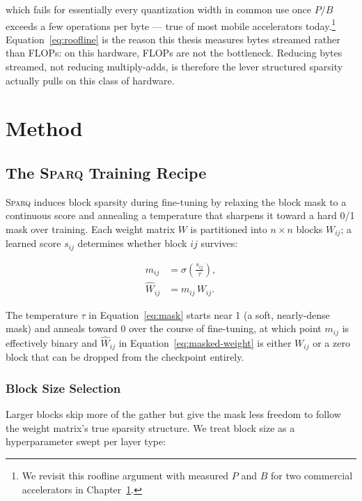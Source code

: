 \documentclass[11pt,twoside]{book}
\newcommand{\model}{\textsc{Sparq}\xspace}
\begin{document}
which fails for essentially every quantization width in common use once
\(P/B\) exceeds a few operations per byte --- true of most mobile
accelerators today.\footnote{We revisit this roofline argument with
measured $P$ and $B$ for two commercial accelerators in
Chapter~\ref{ch:method}.} Equation~\eqref{eq:roofline} is the reason this
thesis measures bytes streamed rather than FLOPs: on this hardware, FLOPs
are not the bottleneck. Reducing bytes streamed, not reducing
multiply-adds, is therefore the lever structured sparsity actually pulls
on this class of hardware.

\chapter{Method}
\label{ch:method}

\section{The \model{} Training Recipe}
\label{sec:sparq}

\model{} induces block sparsity during fine-tuning by relaxing the
block mask to a continuous score and annealing a temperature that
sharpens it toward a hard 0/1 mask over training. Each weight matrix
\(W\) is partitioned into \(n\times n\) blocks \(W_{ij}\); a learned
score \(s_{ij}\) determines whether block \(ij\) survives:

\begin{align}
  m_{ij} &= \sigma\!\left(\frac{s_{ij}}{\tau}\right), \label{eq:mask} \\
  \widehat{W}_{ij} &= m_{ij} \, W_{ij}. \label{eq:masked-weight}
\end{align}

The temperature \(\tau\) in Equation~\ref{eq:mask} starts near 1 (a soft,
nearly-dense mask) and anneals toward 0 over the course of fine-tuning,
at which point \(m_{ij}\) is effectively binary and \(\widehat{W}_{ij}\)
in Equation~\ref{eq:masked-weight} is either \(W_{ij}\) or a zero block
that can be dropped from the checkpoint entirely.

\subsection{Block Size Selection}
\label{sec:block-size}

Larger blocks skip more of the gather but give the mask less freedom to
follow the weight matrix's true sparsity structure. We treat block size
as a hyperparameter swept per layer type:
\end{document}
